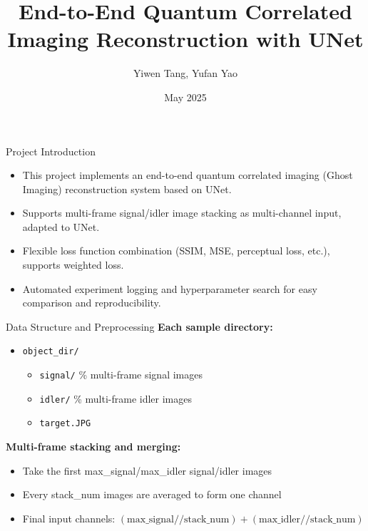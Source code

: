\documentclass{beamer}
\title{End-to-End Quantum Correlated Imaging Reconstruction with UNet}
\author{Yiwen Tang, Yufan Yao}
\date{May 2025}
\begin{document}
\frame{\titlepage}

\begin{frame}{Project Introduction}
\begin{itemize}
    \item This project implements an end-to-end quantum correlated imaging (Ghost Imaging) reconstruction system based on UNet.
    \item Supports multi-frame signal/idler image stacking as multi-channel input, adapted to UNet.
    \item Flexible loss function combination (SSIM, MSE, perceptual loss, etc.), supports weighted loss.
    \item Automated experiment logging and hyperparameter search for easy comparison and reproducibility.
\end{itemize}
\end{frame}

\begin{frame}{Data Structure and Preprocessing}
\textbf{Each sample directory:}
\begin{itemize}
  \item \texttt{object\_dir/}
  \begin{itemize}
    \item \texttt{signal/} \hspace{1em} \% multi-frame signal images
    \item \texttt{idler/} \hspace{1em} \% multi-frame idler images
    \item \texttt{target.JPG}
  \end{itemize}
\end{itemize}
\vspace{0.5em}
\textbf{Multi-frame stacking and merging:}
\begin{itemize}
    \item Take the first max\_signal/max\_idler signal/idler images
    \item Every stack\_num images are averaged to form one channel
    \item Final input channels: $(\text{max\_signal}//\text{stack\_num}) + (\text{max\_idler}//\text{stack\_num})$
\end{itemize}
\end{frame}
\end{document}
